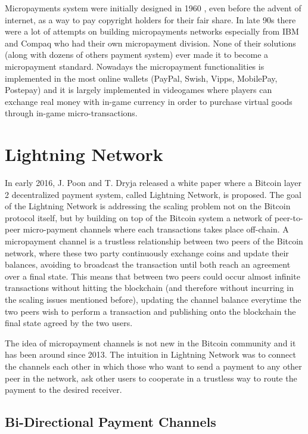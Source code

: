 		Micropayments system were initially designed in 1960 \cite{Nelson1960}, even before the advent of internet, as a way to pay copyright holders for their fair share. In late 90s there were a lot of attempts on building micropayments networks especially from IBM and Compaq who had their own micropayment division. None of their solutions (along with dozens of others payment system) ever made it to become a micropayment standard. Nowadays the micropayment functionalities is implemented in the most online wallets (PayPal, Swish, Vipps, MobilePay, Postepay) and it is largely implemented in videogames where players can exchange real money with in-game currency in order to purchase virtual goods through in-game micro-transactions.
		
		\section{Lightning Network}
		
		In early 2016, J. Poon and T. Dryja released a white paper where a Bitcoin layer 2 decentralized payment system, called Lightning Network, is proposed. The goal of the Lightning Network is addressing the scaling problem not on the Bitcoin protocol itself, but by building on top of the Bitcoin system a network of peer-to-peer micro-payment channels where each transactions takes place off-chain.
		A micropayment channel is a trustless relationship between two peers of the Bitcoin network, where these two party continuously exchange coins and update their balances, avoiding to broadcast the transaction until both reach an agreement over a final state. This means that between two peers could occur almost infinite transactions without hitting the blockchain (and therefore without incurring in the scaling issues mentioned before), updating the channel balance everytime the two peers wish to perform a transaction and publishing onto the blockchain the final state agreed by the two users.
		
		 The idea of micropayment channels is not new in the Bitcoin community and it has been around since 2013\cite{Micropayments:Online}\cite{Micropayments:Bitcoinj}. The intuition in Lightning Network was to connect the channels each other in which those who want to send a payment to any other peer in the network, ask other users to cooperate in a trustless way to route the payment to the desired receiver.
		
		\subsection{Bi-Directional Payment Channels}
		
